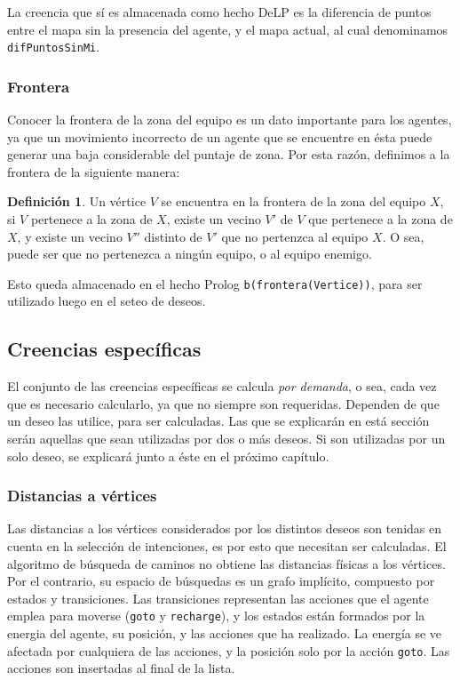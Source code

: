 \documentclass[oneside]{book}
\theoremstyle{definition}
\newtheorem{definicion}{Definición}[section]
\theoremstyle{example}
\begin{document}
La creencia que sí es almacenada como hecho DeLP es la diferencia de puntos entre
el mapa sin la presencia del agente, y el mapa actual, al cual denominamos
\texttt{difPuntosSinMi}.


\subsubsection{Frontera}

Conocer la frontera de la zona del equipo es un dato importante para los agentes,
ya que un movimiento incorrecto de un agente que se encuentre en ésta puede 
generar una baja considerable del puntaje de zona. Por esta razón, definimos a
la frontera de la siguiente manera:

\begin{definicion}
Un vértice $V$ se encuentra en la frontera de la zona del equipo $X$, si $V$ 
pertenece a la zona de $X$, existe un vecino $V'$ de $V$ que pertenece a la zona 
de $X$, y existe un vecino $V''$ distinto de $V'$ que no pertenzca al equipo $X$. 
O sea, puede ser que no pertenezca a ningún equipo, o al equipo enemigo.
\end{definicion}

Esto queda almacenado en el hecho Prolog \texttt{b(frontera(Vertice))}, para ser
utilizado luego en el seteo de deseos.

\subsection{Creencias específicas}

\label{sec:creenciasEspecificas}

El conjunto de las creencias específicas se calcula \textit{por demanda}, o sea, 
cada vez que es necesario calcularlo, ya que no siempre son requeridas. Dependen
de que un deseo las utilice, para ser calculadas. Las que se explicarán en está
sección serán aquellas que sean utilizadas por dos o más deseos. Si son 
utilizadas por un solo deseo, se explicará junto a éste en el próximo capítulo.

\subsubsection{Distancias a vértices}

Las distancias a los vértices considerados por los distintos deseos son tenidas en 
cuenta en la selección de intenciones, es por esto que necesitan ser calculadas.
El algoritmo de búsqueda de caminos no obtiene las distancias físicas a los vértices.
Por el contrario, su espacio de búsquedas es un grafo implícito, compuesto por estados
y transiciones. Las transiciones representan las acciones que el agente emplea
para moverse (\texttt{goto} y \texttt{recharge}), y los estados están formados por 
la energia del agente, su posición, y las acciones que ha realizado. La energía se ve
afectada por cualquiera de las acciones, y la posición solo por la acción \texttt{goto}.
Las acciones son insertadas al final de la lista.
\end{document}
